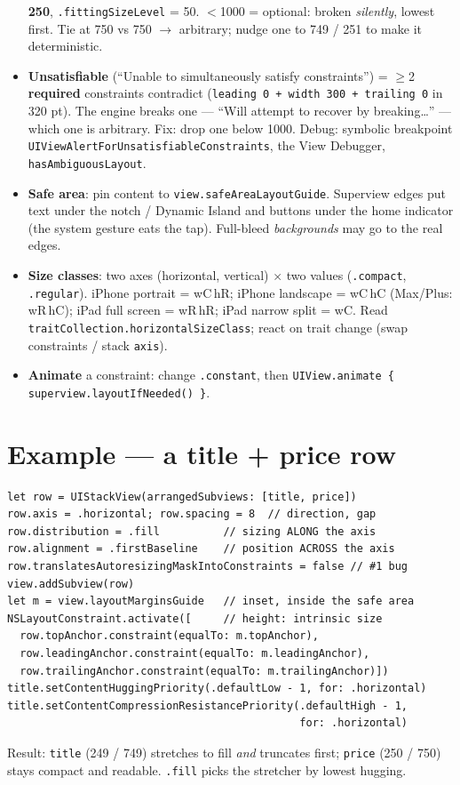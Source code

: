 \documentclass[8pt]{extarticle}
\begin{document}
\begin{multicols}{2}
\begin{itemize}
        \textbf{250}, \texttt{.fittingSizeLevel} = 50. $<$1000 = optional:
        broken \emph{silently}, lowest first. Tie at 750 vs 750 $\to$ arbitrary;
        nudge one to 749 / 251 to make it deterministic.
  \item \textbf{Unsatisfiable} (``Unable to simultaneously satisfy
        constraints'') = $\geq$2 \textbf{required} constraints contradict
        (\texttt{leading 0 + width 300 + trailing 0} in 320 pt). The engine
        breaks one — ``Will attempt to recover by breaking…'' — which one is
        arbitrary. Fix: drop one below 1000. Debug: symbolic breakpoint
        \texttt{UIViewAlertForUnsatisfiableConstraints}, the View Debugger,
        \texttt{hasAmbiguousLayout}.
  \item \textbf{Safe area}: pin content to \texttt{view.safeAreaLayoutGuide}.
        Superview edges put text under the notch / Dynamic Island and buttons
        under the home indicator (the system gesture eats the tap).
        Full-bleed \emph{backgrounds} may go to the real edges.
  \item \textbf{Size classes}: two axes (horizontal, vertical) $\times$ two
        values (\texttt{.compact}, \texttt{.regular}). iPhone portrait = wC\,hR;
        iPhone landscape = wC\,hC (Max/Plus: wR\,hC); iPad full screen =
        wR\,hR; iPad narrow split = wC. Read
        \texttt{traitCollection.horizontalSizeClass}; react on trait change
        (swap constraints / stack \texttt{axis}).
  \item \textbf{Animate} a constraint: change \texttt{.constant}, then
        \texttt{UIView.animate \{ superview.layoutIfNeeded() \}}.
\end{itemize}

\section{Example — a title + price row}
\begin{lstlisting}[language=SwiftSheet]
let row = UIStackView(arrangedSubviews: [title, price])
row.axis = .horizontal; row.spacing = 8  // direction, gap
row.distribution = .fill          // sizing ALONG the axis
row.alignment = .firstBaseline    // position ACROSS the axis
row.translatesAutoresizingMaskIntoConstraints = false // #1 bug
view.addSubview(row)
let m = view.layoutMarginsGuide   // inset, inside the safe area
NSLayoutConstraint.activate([     // height: intrinsic size
  row.topAnchor.constraint(equalTo: m.topAnchor),
  row.leadingAnchor.constraint(equalTo: m.leadingAnchor),
  row.trailingAnchor.constraint(equalTo: m.trailingAnchor)])
title.setContentHuggingPriority(.defaultLow - 1, for: .horizontal)
title.setContentCompressionResistancePriority(.defaultHigh - 1,
                                              for: .horizontal)
\end{lstlisting}
{\footnotesize Result: \texttt{title} (249 / 749) stretches to fill
\emph{and} truncates first; \texttt{price} (250 / 750) stays compact and
readable. \texttt{.fill} picks the stretcher by lowest hugging.}


\end{multicols}
\end{document}
